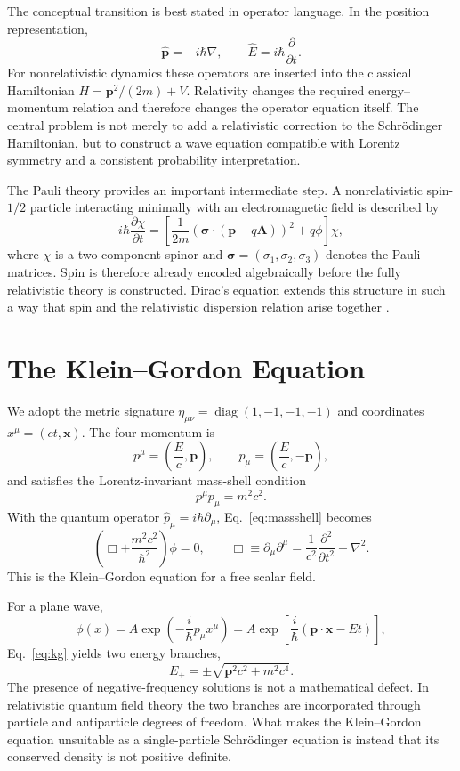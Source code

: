 \documentclass[12pt]{article}
\newcommand{\be}{\begin{equation}}
\newcommand{\ee}{\end{equation}}
\newcommand{\pder}[2]{\frac{\partial #1}{\partial #2}}
\numberwithin{equation}{section}
\begin{document}
The conceptual transition is best stated in operator language. In the position representation,
\be
 \hat{\mathbf{p}}=-i\hbar\nabla,
 \qquad
 \hat{E}=i\hbar\frac{\partial}{\partial t}.
\label{eq:quantization}
\ee
For nonrelativistic dynamics these operators are inserted into the classical Hamiltonian $H=\mathbf{p}^2/(2m)+V$. Relativity changes the required energy--momentum relation and therefore changes the operator equation itself. The central problem is not merely to add a relativistic correction to the Schr\"odinger Hamiltonian, but to construct a wave equation compatible with Lorentz symmetry and a consistent probability interpretation.

The Pauli theory provides an important intermediate step. A nonrelativistic spin-$1/2$ particle interacting minimally with an electromagnetic field is described by
\be
 i\hbar\pder{\chi}{t}
 = \left[
 \frac{1}{2m}\left(\boldsymbol{\sigma}\cdot(\mathbf{p}-q\mathbf{A})\right)^2
 +q\phi
 \right]\chi,
\label{eq:pauli}
\ee
where $\chi$ is a two-component spinor and $\boldsymbol{\sigma}=(\sigma_1,\sigma_2,\sigma_3)$ denotes the Pauli matrices. Spin is therefore already encoded algebraically before the fully relativistic theory is constructed. Dirac's equation extends this structure in such a way that spin and the relativistic dispersion relation arise together \cite{Greiner,Gottfried}.

\section{The Klein--Gordon Equation}

We adopt the metric signature $\eta_{\mu\nu}=\operatorname{diag}(1,-1,-1,-1)$ and coordinates $x^\mu=(ct,\mathbf{x})$. The four-momentum is
\be
 p^\mu=\left(\frac{E}{c},\mathbf{p}\right),
 \qquad
 p_\mu=\left(\frac{E}{c},-\mathbf{p}\right),
\ee
and satisfies the Lorentz-invariant mass-shell condition
\be
 p^\mu p_\mu = m^2c^2.
\label{eq:massshell}
\ee
With the quantum operator $\hat p_\mu=i\hbar\partial_\mu$, Eq.~\eqref{eq:massshell} becomes
\be
 \left(\Box+\frac{m^2c^2}{\hbar^2}\right)\phi=0,
 \qquad
 \Box\equiv\partial_\mu\partial^\mu
 =\frac{1}{c^2}\frac{\partial^2}{\partial t^2}-\nabla^2.
\label{eq:kg}
\ee
This is the Klein--Gordon equation for a free scalar field.

For a plane wave,
\be
 \phi(x)=A\exp\left(-\frac{i}{\hbar}p_\mu x^\mu\right)
 =A\exp\left[\frac{i}{\hbar}(\mathbf{p}\cdot\mathbf{x}-Et)\right],
\label{eq:kg_plane}
\ee
Eq.~\eqref{eq:kg} yields two energy branches,
\be
 E_{\pm}=\pm\sqrt{\mathbf{p}^2c^2+m^2c^4}.
\label{eq:energybranches}
\ee
The presence of negative-frequency solutions is not a mathematical defect. In relativistic quantum field theory the two branches are incorporated through particle and antiparticle degrees of freedom. What makes the Klein--Gordon equation unsuitable as a single-particle Schr\"odinger equation is instead that its conserved density is not positive definite.
\end{document}

